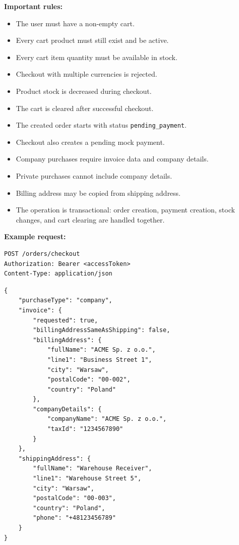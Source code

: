 \textbf{Important rules:}

\begin{itemize}
    \item The user must have a non-empty cart.
    \item Every cart product must still exist and be active.
    \item Every cart item quantity must be available in stock.
    \item Checkout with multiple currencies is rejected.
    \item Product stock is decreased during checkout.
    \item The cart is cleared after successful checkout.
    \item The created order starts with status \texttt{pending\_payment}.
    \item Checkout also creates a pending mock payment.
    \item Company purchases require invoice data and company details.
    \item Private purchases cannot include company details.
    \item Billing address may be copied from shipping address.
    \item The operation is transactional: order creation, payment creation, stock changes, and cart clearing are handled together.
\end{itemize}

\pagebreak
\textbf{Example request:}

\begin{verbatim}
POST /orders/checkout
Authorization: Bearer <accessToken>
Content-Type: application/json
\end{verbatim}

\begin{verbatim}
{
    "purchaseType": "company",
    "invoice": {
        "requested": true,
        "billingAddressSameAsShipping": false,
        "billingAddress": {
            "fullName": "ACME Sp. z o.o.",
            "line1": "Business Street 1",
            "city": "Warsaw",
            "postalCode": "00-002",
            "country": "Poland"
        },
        "companyDetails": {
            "companyName": "ACME Sp. z o.o.",
            "taxId": "1234567890"
        }
    },
    "shippingAddress": {
        "fullName": "Warehouse Receiver",
        "line1": "Warehouse Street 5",
        "city": "Warsaw",
        "postalCode": "00-003",
        "country": "Poland",
        "phone": "+48123456789"
    }
}
\end{verbatim}

